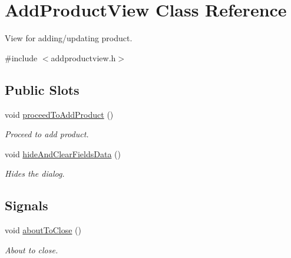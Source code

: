 \hypertarget{class_add_product_view}{\section{\-Add\-Product\-View \-Class \-Reference}
\label{class_add_product_view}
}


\-View for adding/updating product.  




{\ttfamily \#include $<$addproductview.\-h$>$}

\subsection*{\-Public \-Slots}
\begin{DoxyCompactItemize}
\item 
void \hyperlink{class_add_product_view_a11a43220cb6b1f4fb5087f135a06c93a}{proceed\-To\-Add\-Product} ()
\begin{DoxyCompactList}\small\item\em \-Proceed to add product. \end{DoxyCompactList}\item 
void \hyperlink{class_add_product_view_aaec4689251b4dde8793176b53bee637f}{hide\-And\-Clear\-Fields\-Data} ()
\begin{DoxyCompactList}\small\item\em \-Hides the dialog. \end{DoxyCompactList}\end{DoxyCompactItemize}
\subsection*{\-Signals}
\begin{DoxyCompactItemize}
\item 
void \hyperlink{class_add_product_view_ab8302aefc6a85f05925a0019b947ddaf}{about\-To\-Close} ()
\begin{DoxyCompactList}\small\item\em \-About to close. \end{DoxyCompactList}\end{DoxyCompactItemize}
